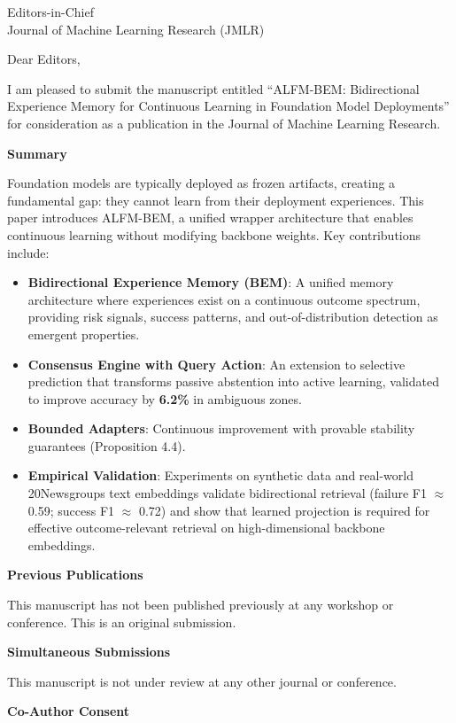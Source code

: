 \documentclass[11pt]{letter}
\begin{document}
\begin{letter}{Editors-in-Chief\\Journal of Machine Learning Research (JMLR)}

\opening{Dear Editors,}

I am pleased to submit the manuscript entitled ``ALFM-BEM: Bidirectional Experience Memory for Continuous Learning in Foundation Model Deployments'' for consideration as a publication in the Journal of Machine Learning Research.

\noindent\textbf{Summary}

Foundation models are typically deployed as frozen artifacts, creating a fundamental gap: they cannot learn from their deployment experiences. This paper introduces ALFM-BEM, a unified wrapper architecture that enables continuous learning without modifying backbone weights. Key contributions include:
\begin{itemize}
    \item \textbf{Bidirectional Experience Memory (BEM)}: A unified memory architecture where experiences exist on a continuous outcome spectrum, providing risk signals, success patterns, and out-of-distribution detection as emergent properties.
    \item \textbf{Consensus Engine with Query Action}: An extension to selective prediction that transforms passive abstention into active learning, validated to improve accuracy by \textbf{6.2\%} in ambiguous zones.
    \item \textbf{Bounded Adapters}: Continuous improvement with provable stability guarantees (Proposition 4.4).
    \item \textbf{Empirical Validation}: Experiments on synthetic data and real-world 20Newsgroups text embeddings validate bidirectional retrieval (failure F1 $\approx$ 0.59; success F1 $\approx$ 0.72) and show that learned projection is required for effective outcome-relevant retrieval on high-dimensional backbone embeddings.
\end{itemize}

\noindent\textbf{Previous Publications}

This manuscript has not been published previously at any workshop or conference. This is an original submission.

\noindent\textbf{Simultaneous Submissions}

This manuscript is not under review at any other journal or conference.

\noindent\textbf{Co-Author Consent}


\end{letter}
\end{document}
